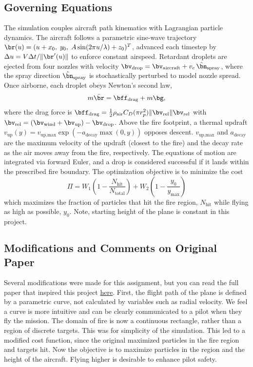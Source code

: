 \documentclass{article}
\begin{document}
\subsection*{Governing Equations}
The simulation couples aircraft path kinematics with Lagrangian particle dynamics. The aircraft follows a parametric sine-wave trajectory $\br(u) = (u + x_0,\; y_0,\; A\sin(2\pi u/\lambda) + z_0)^T$, advanced each timestep by $\Delta u = V\Delta t / \|\br'(u)\|$ to enforce constant airspeed. Retardant droplets are ejected from four nozzles with velocity $\bv_\text{drop} = \bv_\text{aircraft} + v_e\,\hat{\bn}_\text{spray}$, where the spray direction $\hat{\bn}_\text{spray}$ is stochastically perturbed to model nozzle spread. Once airborne, each droplet obeys Newton's second law,
\begin{equation}
    m\ddot{\br} = \bff_\text{drag} + m\bg,
\end{equation}
where the drag force is $\bff_\text{drag} = \frac{1}{2}\rho_\text{air} C_D (\pi r_p^2)\|\bv_\text{rel}\|\bv_\text{rel}$ with $\bv_\text{rel} = (\bv_\text{wind} + \bv_\text{up}) - \bv_\text{drop}$. Above the fire footprint, a thermal updraft $v_\text{up}(y) = v_{\text{up,max}}\exp(-a_{\text{decay}}\max(0,y))$ opposes descent. $v_{\text{up,max}}$ and $a_{\text{decay}}$ are the maximum velocity of the updraft (closest to the fire) and the decay rate as the air moves away from the fire, respectively. The equations of motion are integrated via forward Euler, and a drop is considered successful if it lands within the prescribed fire boundary. The optimization objective is to minimize the cost 
\begin{equation}
    \Pi = W_1\left(1 - \frac{N_\text{hit}}{N_\text{total}} \right) + W_2\left(1 - \frac{y_0}{y_{\text{max}}} \right)
\end{equation}
which maximizes the fraction of particles that hit the fire region, $N_{\text{hit}}$ while flying as high as possible, $y_0$. Note, starting height of the plane is constant in this project.



\subsection*{Modifications and Comments on Original Paper}
Several modifications were made for this assignment, but you can read the full paper that inspired this project \href{https://msol.berkeley.edu/wp-content/uploads/2023/10/181.pdf}{here}. First, the flight path of the plane is defined by a parametric curve, not calculated by variables such as radial velocity. We feel a curve is more intuitive and can be clearly communicated to a pilot when they fly the mission. The domain of fire is now a continuous rectangle, rather than a region of discrete targets. This was for simplicity of the simulation. This led to a modified cost function, since the original maximized particles in the fire region and targets hit. Now the objective is to maximize particles in the region and the height of the aircraft. Flying higher is desirable to enhance pilot safety. 
\end{document}

